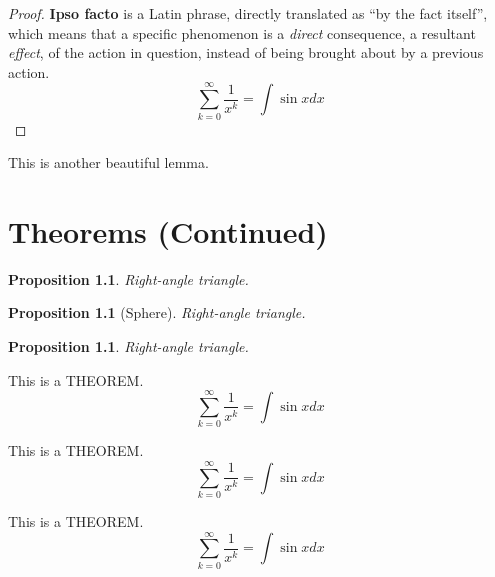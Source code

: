 \documentclass[twoside]{fduthesis-en}
\begin{document}
\begin{proof}
\textbf{Ipso facto} is a Latin phrase, directly translated as ``by the fact itself'',
which means that a specific phenomenon is a \emph{direct} consequence, a
resultant \textit{effect}, of the action in question, instead of being brought
about by a previous action.
\begin{equation*}
  \sum_{k=0}^{\infty} \frac{1}{x^k} = \int \sin x dx
\end{equation*}
\end{proof}

\begin{lemma}
This is another beautiful lemma.
\end{lemma}

\chapter{Theorems (Continued)}


\newtheorem{prop}[thm]{Proposition}

\begin{prop}
  Right-angle triangle.
\end{prop}
\begin{prop}[Sphere]
  Right-angle triangle.
\end{prop}
\begin{prop}
  Right-angle triangle.
\end{prop}

\begin{p}
This is a THEOREM.
\[ \sum_{k=0}^{\infty} \frac{1}{x^k} = \int \sin x dx \]
\end{p}

\begin{mm}
This is a THEOREM.
\[ \sum_{k=0}^{\infty} \frac{1}{x^k} = \int \sin x dx \]
\end{mm}

\begin{fduc}
This is a THEOREM.
\[ \sum_{k=0}^{\infty} \frac{1}{x^k} = \int \sin x dx \]
\end{fduc}
\end{document}
